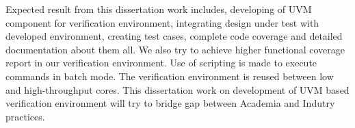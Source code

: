 \thispagestyle{plain}

Expected result from this dissertation work includes, developing of UVM component for verification environment, integrating design under test with developed environment, creating test cases, complete code coverage and detailed documentation about them all. We also try to achieve higher functional coverage report in our verification environment. Use of scripting is made to execute commands in batch mode. The verification environment is reused between low and high-throughput cores. This dissertation work on development of UVM based verification environment will try to bridge gap between Academia and Indutry practices.